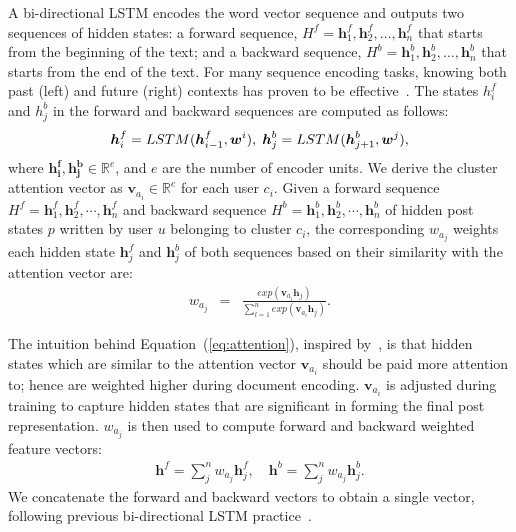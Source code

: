 \documentclass{bmcart}
\begin{document}
A bi-directional LSTM encodes the word 
vector sequence and outputs two sequences of hidden states: a forward sequence,
$H^f={\boldsymbol{h}^f_1, \boldsymbol{h}^f_2,\ldots,
  \boldsymbol{h}^f_n}$ that starts from the beginning of the text; and
a backward sequence, $H^b={\boldsymbol{h}^b_1,
  \boldsymbol{h}^b_2,\ldots, \boldsymbol{h}^b_n}$ that starts from the
end of the text. For many sequence encoding tasks, knowing both past
(left) and future (right) contexts has proven to be effective~\cite{dyer2015transition}. The states $h^f_i$ and $h^b_j$ in
the forward and backward sequences are computed as follows:
\begin{eqnarray}
  \boldsymbol{h}^f_i=LSTM(\boldsymbol{h}^f_{i-1}, \boldsymbol{w}^i),
  \hspace{1mm}\boldsymbol{h}^b_j=LSTM(\boldsymbol{h}^b_{j+1}, \boldsymbol{w}^j), \nonumber 
\end{eqnarray}
where $\boldsymbol{h^f_i}, \boldsymbol{h^b_j}\in \mathbb{R}^e$, and
$e$ are the number of encoder units. We derive the cluster attention vector as
$\boldsymbol{v}_{a_i}\in\mathbb{R}^e$ for each user $c_i$. Given a forward sequence $H^f={\boldsymbol{h}^f_1, \boldsymbol{h}^f_2,\cdots,
  \boldsymbol{h}^f_n}$ and backward sequence $H^b={\boldsymbol{h}^b_1,
  \boldsymbol{h}^b_2,\cdots, \boldsymbol{h}^b_n}$ of hidden 
post states $p$ written by user $u$ belonging to cluster $c_i$, the
corresponding $w_{a_{j}}$ weights each hidden state $\boldsymbol{h}^f_j$ and
$\boldsymbol{h}^b_j$ of both sequences based on
their similarity with the attention vector are:
\begin{eqnarray}\label{eq:attention}
  w_{a_j}&=&\frac{exp(\boldsymbol{v}_{a_i}  \boldsymbol{h}_j)}{\sum^n_{l=1}exp(\boldsymbol{v}_{a_i} \boldsymbol{h}_j)}. 
\end{eqnarray}

The intuition behind Equation~(\ref{eq:attention}), inspired by~\cite{luong2015effective}, is that hidden states which are similar to
the attention vector $\boldsymbol{v}_{a_{i}}$ should be paid more
attention to; hence are weighted higher during document
encoding. $\boldsymbol{v}_{a_{i}}$ is adjusted during training to
capture hidden states that are significant in forming the final post
representation. $w_{a_j}$ is then used to compute forward and backward
weighted feature vectors:
\begin{eqnarray}\label{eq:w_sum}
  \boldsymbol{h}^f=\sum^n_j w_{a_j} \boldsymbol{h}^f_j, 
  \quad\boldsymbol{h}^b=\sum^n_j w_{a_j} \boldsymbol{h}^b_j. 
\end{eqnarray}
We concatenate the forward and backward vectors to obtain a single
vector, following previous bi-directional LSTM practice~\cite{ma2016end}. \\
\end{document}
